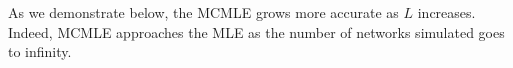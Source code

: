 \documentclass[10pt, conference, compsocconf]{IEEEtran}
\begin{document}
%
%

\noindent As we demonstrate below, the MCMLE grows more accurate as $L$ increases. Indeed, MCMLE approaches the MLE as the number of networks simulated goes to infinity. 
\end{document}
